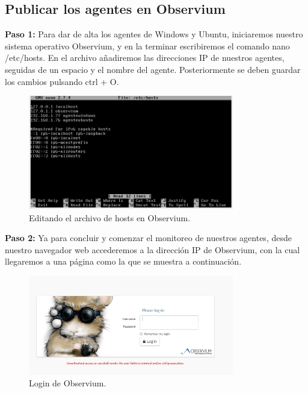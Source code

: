 
\pagebreak
\subsection{Publicar los agentes en Observium}

\noindent
\newline
\textbf{Paso 1:} Para dar de alta los agentes de Windows y Ubuntu, iniciaremos nuestro sistema operativo Observium, y en la terminar escribiremos el comando nano /etc/hosts.  En el archivo añadiremos las direcciones IP de nuestros agentes, seguidas de un espacio y el nombre del agente. Posteriormente se deben guardar los cambios pulsando ctrl + O. 

\begin{figure}[htbp!]
	\centering
		\includegraphics[width=0.8\textwidth]{images/desarrollo/agregar_agente1.png}
	\caption{Editando el archivo de hosts en Observium.}
\end{figure}

\noindent
\newline
\textbf{Paso 2:} Ya para concluir y comenzar el monitoreo de nuestros agentes, desde nuestro navegador web accederemos a la dirección IP de Observium, con la cual llegaremos a una página como la que se muestra a continuación.

\begin{figure}[htbp!]
	\centering
		\includegraphics[width=0.8\textwidth]{images/desarrollo/agregar_agente2.png}
	\caption{Login de Observium.}
\end{figure}

